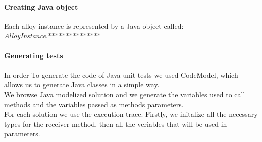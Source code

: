 \paragraph{Creating Java object}
Each alloy instance is represented by a Java object called: \textit{AlloyInstance}.***************

\paragraph{Generating tests}
In order To generate the code of Java unit tests we used CodeModel, which allows us to generate Java classes in a simple way.\\
We browse Java modelized solution and we generate the variables used to call methods and the variables passed as methods parameters.\\
For each solution we use the execution trace.
Firstly, we initalize all the necessary types for the receiver method, then all the veriables that will be used in parameters.